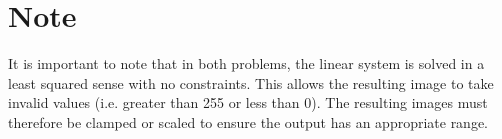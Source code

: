 \documentclass{InsightArticle}
\begin{document}
\section{Note}
It is important to note that in both problems, the linear system is solved in a least squared sense with no constraints. This allows the resulting image to take invalid values (i.e. greater than 255 or less than 0). The resulting images must therefore be clamped or scaled to ensure the output has an appropriate range.


\end{document}
